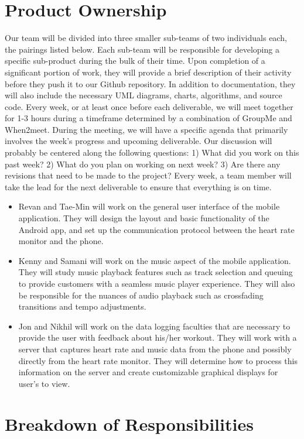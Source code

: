 \documentclass[letterpaper,english, 12pt]{scrreprt}
\begin{document}
\section{Product Ownership}
Our team will be divided into three smaller sub-teams of two individuals each, the pairings listed below. Each sub-team will be responsible for developing a specific sub-product during the bulk of their time. Upon completion of a significant portion of work, they will provide a brief description of their activity before they push it to our Github repository. In addition to documentation, they will also include the necessary UML diagrams, charts, algorithms, and source code. Every week, or at least once before each deliverable, we will meet together for 1-3 hours during a timeframe determined by a combination of GroupMe and When2meet. During the meeting, we will have a specific agenda that primarily involves the week's progress and upcoming deliverable. Our discussion will probably be centered along the following questions: 1) What did you work on this past week? 2) What do you plan on working on next week? 3) Are there any revisions that need to be made to the project? Every week, a team member will take the lead for the next deliverable to ensure that everything is on time.          	
\begin{itemize}
	\item Revan and Tae-Min will work on the general user interface of the mobile application. They will design the layout and basic functionality of the Android app, and set up the communication protocol between the heart rate monitor and the phone. 
	\item Kenny and Samani will work on the music aspect of the mobile application. They will study music playback features such as track selection and queuing to provide customers with a seamless music player experience. They will also be responsible for the nuances of audio playback such as crossfading transitions and tempo adjustments.
	\item Jon and Nikhil will work on the data logging faculties that are necessary to provide the user with feedback about his/her workout. They will work with a server that captures heart rate and music data from the phone and possibly directly from the heart rate monitor. They will determine how to process this information on the server and create customizable graphical displays for user's to view.
\end{itemize}


\section{Breakdown of Responsibilities}
\end{document}
